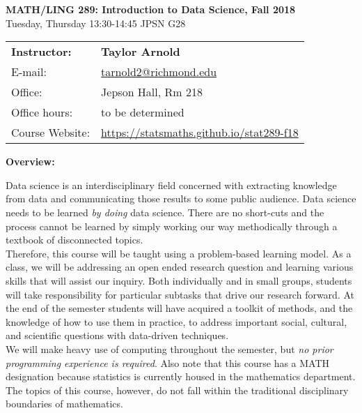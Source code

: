 \documentclass[12pt]{article}
\begin{document}
\begin{center}
{\bf MATH/LING 289: Introduction to Data Science, Fall 2018} \\
Tuesday, Thursday 13:30-14:45 \quad JPSN G28\\
\end{center}

\bigskip

\noindent
\begin{tabular}{ l l }
{\bf Instructor:} &  {\bf Taylor Arnold} \\
E-mail: & \href{mailto:tarnold2@richmond.edu}{tarnold2@richmond.edu} \\
Office: & Jepson Hall, Rm 218 \\
Office hours: & to be determined \\
Course Website: & \url{https://statsmaths.github.io/stat289-f18}
\end{tabular}

\vspace{0.5cm}

\textbf{Overview:} \vspace{6pt}

Data science is an interdisciplinary field concerned with extracting knowledge
from data and communicating those results to some public audience. Data
science needs to be learned \textit{by doing} data science. There are
no short-cuts and the process cannot be learned by simply working our way
methodically through a textbook of disconnected topics.\\

Therefore, this course will be taught using a problem-based learning model. As
a class, we will be addressing an open ended research question and learning
various skills that will assist our inquiry. Both individually and in small
groups, students will take responsibility for particular subtasks that drive
our research forward. At the end of the semester students will have acquired
a toolkit of methods, and the knowledge of how to use them in practice, to
address important social, cultural, and scientific questions with data-driven
techniques.\\

We will make heavy use of computing throughout the semester, but \textit{no
prior programming experience is required}. Also note that this course has a
MATH designation because statistics is currently housed in the mathematics
department. The topics of this course, however, do not fall within the
traditional disciplinary boundaries of mathematics.\\
\end{document}
